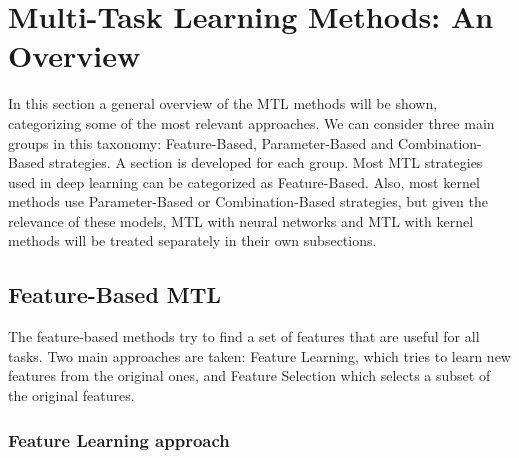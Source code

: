 \section{Multi-Task Learning Methods: An Overview}\label{sec:ch3_overview}
In this section a general overview of the MTL methods will be shown, categorizing some of the most relevant approaches. We can consider three main groups in this taxonomy: Feature-Based, Parameter-Based and Combination-Based strategies. 
A section is developed for each group.
Most MTL strategies used in deep learning can be categorized as Feature-Based. Also, most kernel methods use Parameter-Based or Combination-Based strategies, but given the relevance of these models, MTL with neural networks and MTL with kernel methods will be treated separately in their own subsections. 

\subsection{Feature-Based MTL}\label{subsec:featbased_mtl}
The feature-based methods try to find a set of features that are useful for all tasks. Two main approaches are taken: Feature Learning, which tries to learn new features from the original ones, and Feature Selection which selects a subset of the original features.


\subsubsection*{Feature Learning approach}


